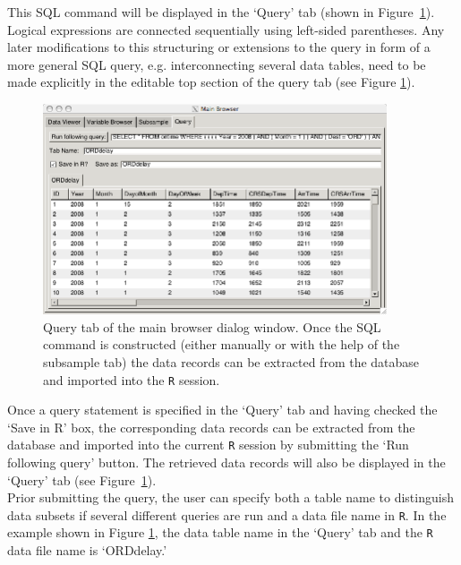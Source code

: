 \documentclass[11pt]{tise_style}
\begin{document}
This SQL command will be displayed in the `Query' tab (shown in Figure~\ref{dbquery}). Logical expressions are connected sequentially using left-sided parentheses. Any later modifications to this structuring or extensions to the query in form of a more general SQL query, e.g. interconnecting several data tables, need to be made explicitly in the editable top section of the query tab (see Figure \ref{dbquery}).     \\[.25cm]
\begin{figure}[htbp] %
   \centering
   \includegraphics[width=4in]{db-query.png} 
   \caption{Query tab of the main browser dialog window. Once the SQL command is constructed (either manually or with the help of the subsample tab) the data records can be extracted from the database and imported into the {\tt R} session.}
   \label{dbquery}
\end{figure}


Once a query statement is specified in the `Query' tab and having checked the `Save in R' box, the corresponding data records can be extracted from the database and imported into the current {\tt R} session by submitting the `Run following query' button.  The retrieved data records will also be displayed in the `Query' tab (see Figure~\ref{dbquery}). \\
Prior submitting the query, the user can specify both a table name to distinguish data subsets if several different queries are run and a data file name in {\tt R}. In the example shown in Figure \ref{dbquery}, the data table name in the `Query' tab and the {\tt R} data file name is `ORDdelay.'
%
%
%
%
\end{document}
